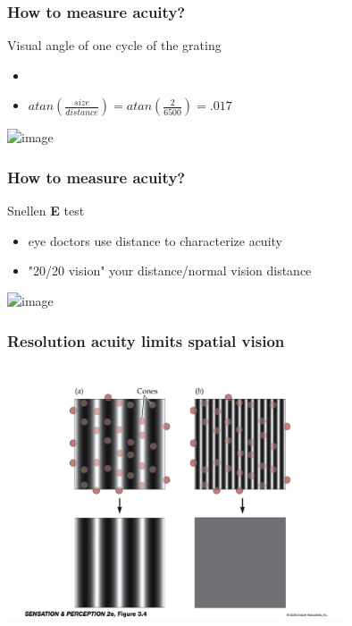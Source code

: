 \documentclass[]{beamer}
\begin{document}
\begin{frame}
\frametitle{How to measure acuity?}
\begin{overlayarea}{110mm}{60mm}
Visual angle of one cycle of the grating 
\begin{itemize} 
 \item[]
 \item $atan(\frac{size}{distance}) = atan(\frac{2}{6500})=.017$
\end{itemize}
  \begin{center}
\includegraphics<1>[width=80mm]{figs/l3/visual_angle.png}
 \end{center}
\end{overlayarea}
\end{frame}

\begin{frame}
\frametitle{How to measure acuity?}
\begin{overlayarea}{110mm}{60mm}
Snellen \textbf{E} test
\begin{itemize} 
 \item eye doctors use distance to characterize acuity
 \item "20/20 vision" your distance/normal vision distance
\end{itemize}
  \begin{center}
\includegraphics<1>[width=50mm]{figs/l3/snellen_E.png}
 \end{center}
\end{overlayarea}
\end{frame}

\begin{frame}
\frametitle{Resolution acuity limits spatial vision}
  \begin{center}
\includegraphics[width=100mm]{figs/l3/grating_sampling.png}
 \end{center}
\end{frame}
\end{document}
